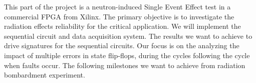 %
%
%
%





This part of the project is a neutron-induced Single Event Effect test in a commercial FPGA from Xilinx. The primary objective is to investigate the radiation effects reliability for the critical application. We will implement the sequential circuit and data acquisition system. The results we want to achieve to drive signatures for the sequential circuits. Our focus is on the analyzing the impact of multiple errors in state flip-flops, during the cycles following the cycle when faults occur. The following milestones we want to achieve from radiation bombardment experiment.


